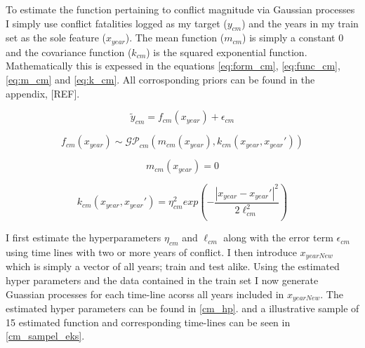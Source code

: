 \documentclass[a4paper]{article}
\begin{document}
To estimate the function pertaining to conflict magnitude via Gaussian processes I simply use conflict fatalities logged as my target ($y_{cm}$) and the years in my train set as the sole feature ($x_{year}$). The mean function ($m_{cm}$) is simply a constant $0$ and the covariance function ($k_{cm}$) is the squared exponential function. Mathematically this is expessed in the equations \ref{eq:form_cm}, \ref{eq:func_cm}, \ref{eq:m_cm} and \ref{eq:k_cm}. All corrosponding priors can be found in the appendix, [REF].\par

\[
\tilde{y}_{cm} = f_{cm}(x_{year}) + \epsilon_{cm} \tag{19} \label{eq:form_cm}
\]

\[
f_{cm}(x_{year}) \sim \mathcal{GP}_{cm}(m_{cm}(x_{year}),k_{cm}(x_{year},x_{year}')) \tag{20} \label{eq:func_cm}
\]

\[
m_{cm}(x_{year}) = 0 \tag{21} \label{eq:m_cm}
\]

\[
k_{cm}(x_{year},x_{year}') = \eta_{cm}^2 exp\left(-\frac{|x_{year}-x_{year}'|^2}{2\ell_{cm}^2}\right) \tag{22} \label{eq:k_cm}
\]

I first estimate the hyperparameters $\eta_{cm}$ and $\ell_{cm}$ along with the error term $\epsilon_{cm}$ using time lines with two or more years of conflict. I then introduce $x_{yearNew}$ which is simply a vector of all years; train and test alike. Using the estimated hyper parameters and the data contained in the train set I now generate Guassian processes for each time-line acorss all years included in $x_{yearNew}$. The estimated hyper parameters can be found in \autoref{cm_hp}. and a illustrative sample of 15 estimated function and corresponding time-lines can be seen in \autoref{cm_sampel_eks}.
\end{document}
